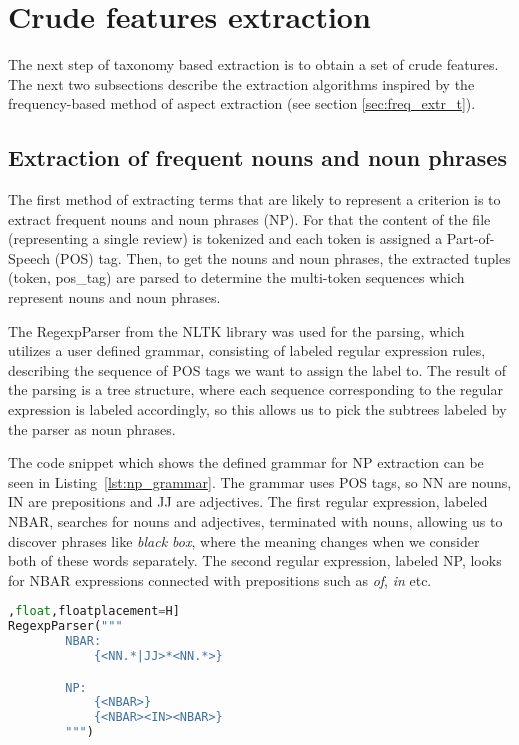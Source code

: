 \section{Crude features extraction}
The next step of taxonomy based extraction is to obtain a set of crude features. The next two subsections describe the extraction algorithms inspired by the frequency-based method of aspect extraction (see section \ref{sec:freq_extr_t}).

\subsection{Extraction of frequent nouns and noun phrases}
The first method of extracting terms that are likely to represent a criterion is to extract frequent nouns and noun phrases (NP). For that the content of the file (representing a single review) is tokenized and each token is assigned a Part-of-Speech (POS) tag. Then, to get the nouns and noun phrases, the extracted tuples (token, pos\_tag) are parsed to determine the multi-token sequences which represent nouns and noun phrases. 

The RegexpParser from the NLTK library was used for the parsing, which utilizes a user defined grammar, consisting of labeled regular expression rules, describing the sequence of POS tags we want to assign the label to. The result of the parsing is a tree structure, where each sequence corresponding to the regular expression is labeled accordingly, so this allows us to pick the subtrees labeled by the parser as noun phrases. 

The code snippet which shows the defined grammar for NP extraction can be seen in Listing~\ref{lst:np_grammar}. 
The grammar uses POS tags, so NN are nouns, IN are prepositions and JJ are adjectives. The first regular expression, labeled NBAR, searches for nouns and adjectives, terminated with nouns, allowing us to discover phrases like \textit{black box}, where the meaning changes when we consider both of these words separately. The second regular expression, labeled NP, looks for NBAR expressions connected with prepositions such as \textit{of}, \textit{in} etc. \cite{nltk_np}

\begin{lstlisting}[language=python,caption={Grammar for the extraction of noun phrases.}, label={lst:np_grammar}, xleftmargin=.2\textwidth, xrightmargin=.2\textwidth],float,floatplacement=H]
RegexpParser("""
        NBAR:
            {<NN.*|JJ>*<NN.*>} 

        NP:
            {<NBAR>}
            {<NBAR><IN><NBAR>}
        """)
\end{lstlisting}


